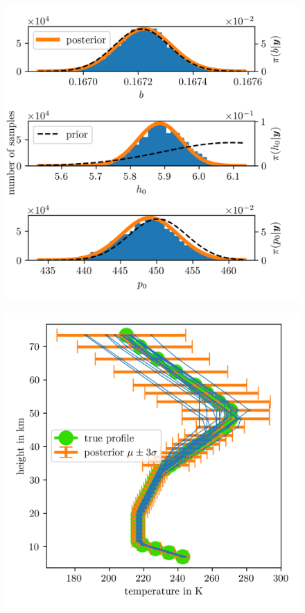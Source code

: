 \begin{figure}[ht!]
	\centering
	\includegraphics{PHdPTPost4.png}
	\caption[]{}
	\label{fig:}
\end{figure}

\begin{figure}[ht!]
	\centering
	\includegraphics{TempPostMeanSigm.png}
	\caption[]{}
	\label{fig:}
\end{figure}

